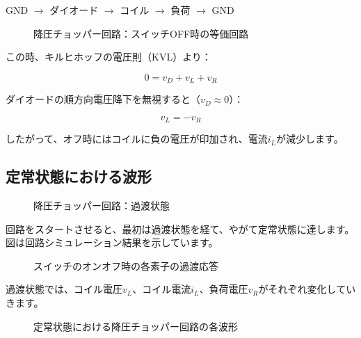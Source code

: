 \begin{center}
GND $\rightarrow$ ダイオード $\rightarrow$ コイル $\rightarrow$ 負荷 $\rightarrow$ GND
\end{center}

\begin{figure}[H]
\centering
{}
\caption{降圧チョッパー回路：スイッチOFF時の等価回路}
\label{fig:ch05_buck_off}
\end{figure}

この時、キルヒホッフの電圧則（KVL）より：

\begin{equation}
0 = v_D + v_L + v_R
\end{equation}

ダイオードの順方向電圧降下を無視すると（$v_D \approx 0$）：

\begin{equation}
v_L = -v_R
\end{equation}

したがって、オフ時にはコイルに負の電圧が印加され、電流$i_L$が減少します。

\subsection{定常状態における波形}

\begin{figure}[H]
\centering
{}
\caption{降圧チョッパー回路：過渡状態}
\label{fig:ch05_buck_transient}
\end{figure}

回路をスタートさせると、最初は過渡状態を経て、やがて定常状態に達します。図は回路シミュレーション結果を示しています。

\begin{figure}[H]
\centering
{}
\caption{スイッチのオンオフ時の各素子の過渡応答}
\label{fig:ch05_buck_element_transient}
\end{figure}

過渡状態では、コイル電圧$v_L$、コイル電流$i_L$、負荷電圧$v_R$がそれぞれ変化していきます。

\begin{figure}[H]
\centering
{}
\caption{定常状態における降圧チョッパー回路の各波形}
\label{fig:ch05_buck_steady_waveforms}
\end{figure}

